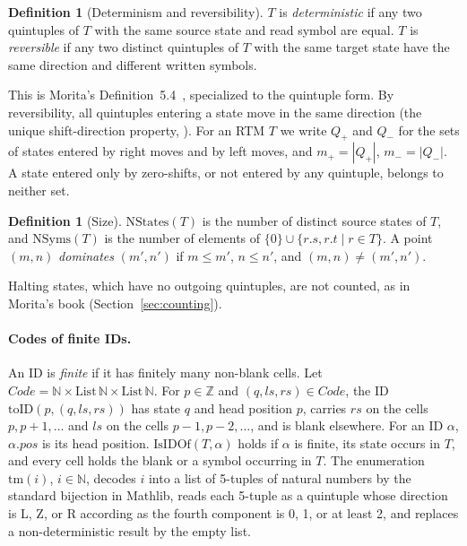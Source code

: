 \documentclass{article}
\theoremstyle{definition}
\newtheorem{definition}[theorem]{Definition}
\theoremstyle{remark}
\newcommand{\Code}{\mathit{Code}}
\newcommand{\pos}{\mathit{pos}}
\begin{document}
\begin{definition}[Determinism and reversibility]
$T$ is \emph{deterministic} if any two quintuples of $T$ with the same source state and read symbol are equal.
$T$ is \emph{reversible} if any two distinct quintuples of $T$ with the same target state have the same direction and different written symbols.
\end{definition}

This is Morita's Definition~5.4~\cite{Morita17}, specialized to the quintuple form.
By reversibility, all quintuples entering a state move in the same direction (the unique shift-direction property, \cite[Lemma~5.5]{Morita17}).
For an RTM $T$ we write $Q_+$ and $Q_-$ for the sets of states entered by right moves and by left moves, and $m_+=|Q_+|$, $m_-=|Q_-|$. A state entered only by zero-shifts, or not entered by any quintuple, belongs to neither set.

\begin{definition}[Size]
$\mathrm{NStates}(T)$ is the number of distinct source states of $T$, and $\mathrm{NSyms}(T)$ is the number of elements of $\{0\}\cup\{r.s,r.t\mid r\in T\}$.
A point $(m,n)$ \emph{dominates} $(m',n')$ if $m\le m'$, $n\le n'$, and $(m,n)\ne(m',n')$.
\end{definition}

Halting states, which have no outgoing quintuples, are not counted, as in Morita's book (Section~\ref{sec:counting}).

\paragraph{Codes of finite IDs.}
An ID is \emph{finite} if it has finitely many non-blank cells.
Let $\Code=\mathbb{N}\times\mathrm{List}\,\mathbb{N}\times\mathrm{List}\,\mathbb{N}$.
For $p\in\mathbb{Z}$ and $(q,\mathit{ls},\mathit{rs})\in\Code$, the ID $\mathrm{toID}(p,(q,\mathit{ls},\mathit{rs}))$ has state $q$ and head position $p$, carries $\mathit{rs}$ on the cells $p,p+1,\dots$ and $\mathit{ls}$ on the cells $p-1,p-2,\dots$, and is blank elsewhere.
For an ID $\alpha$, $\alpha.\pos$ is its head position.
$\mathrm{IsIDOf}(T,\alpha)$ holds if $\alpha$ is finite, its state occurs in $T$, and every cell holds the blank or a symbol occurring in $T$.
The enumeration $\mathrm{tm}(i)$, $i\in\mathbb{N}$, decodes $i$ into a list of 5-tuples of natural numbers by the standard bijection in Mathlib, reads each 5-tuple as a quintuple whose direction is L, Z, or R according as the fourth component is 0, 1, or at least 2, and replaces a non-deterministic result by the empty list.
\end{document}
